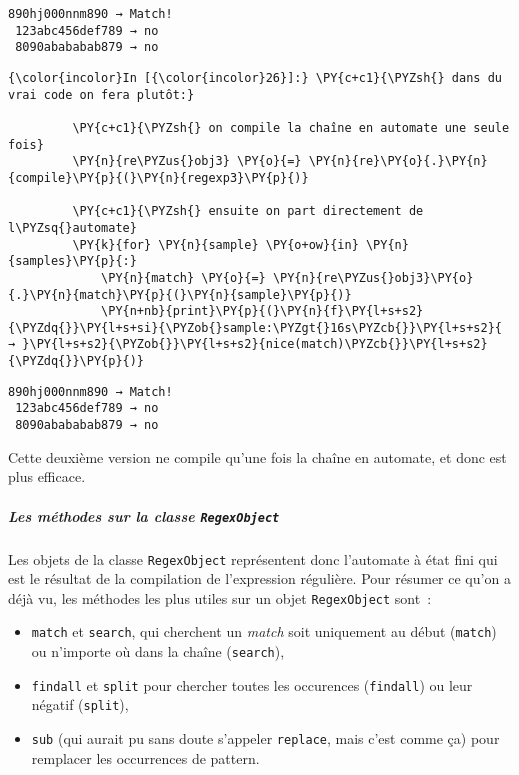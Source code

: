     \begin{Verbatim}[commandchars=\\\{\},frame=single,framerule=0.3mm,rulecolor=\color{cellframecolor}]
  890hj000nnm890 → Match!
 123abc456def789 → no
 8090abababab879 → no
\end{Verbatim}

    \begin{Verbatim}[commandchars=\\\{\},frame=single,framerule=0.3mm,rulecolor=\color{cellframecolor}]
{\color{incolor}In [{\color{incolor}26}]:} \PY{c+c1}{\PYZsh{} dans du vrai code on fera plutôt:}
         
         \PY{c+c1}{\PYZsh{} on compile la chaîne en automate une seule fois}
         \PY{n}{re\PYZus{}obj3} \PY{o}{=} \PY{n}{re}\PY{o}{.}\PY{n}{compile}\PY{p}{(}\PY{n}{regexp3}\PY{p}{)}
         
         \PY{c+c1}{\PYZsh{} ensuite on part directement de l\PYZsq{}automate}
         \PY{k}{for} \PY{n}{sample} \PY{o+ow}{in} \PY{n}{samples}\PY{p}{:}
             \PY{n}{match} \PY{o}{=} \PY{n}{re\PYZus{}obj3}\PY{o}{.}\PY{n}{match}\PY{p}{(}\PY{n}{sample}\PY{p}{)}
             \PY{n+nb}{print}\PY{p}{(}\PY{n}{f}\PY{l+s+s2}{\PYZdq{}}\PY{l+s+si}{\PYZob{}sample:\PYZgt{}16s\PYZcb{}}\PY{l+s+s2}{ → }\PY{l+s+s2}{\PYZob{}}\PY{l+s+s2}{nice(match)\PYZcb{}}\PY{l+s+s2}{\PYZdq{}}\PY{p}{)}
\end{Verbatim}


    \begin{Verbatim}[commandchars=\\\{\},frame=single,framerule=0.3mm,rulecolor=\color{cellframecolor}]
  890hj000nnm890 → Match!
 123abc456def789 → no
 8090abababab879 → no
\end{Verbatim}

    Cette deuxième version ne compile qu'une fois la chaîne en automate, et
donc est plus efficace.

    \hypertarget{les-muxe9thodes-sur-la-classe-regexobject}{%
\subparagraph{\texorpdfstring{Les méthodes sur la classe
\texttt{RegexObject}}{Les méthodes sur la classe RegexObject}}\label{les-muxe9thodes-sur-la-classe-regexobject}}

    Les objets de la classe \texttt{RegexObject} représentent donc
l'automate à état fini qui est le résultat de la compilation de
l'expression régulière. Pour résumer ce qu'on a déjà vu, les méthodes
les plus utiles sur un objet \texttt{RegexObject} sont~:

\begin{itemize}
\tightlist
\item
  \texttt{match} et \texttt{search}, qui cherchent un \emph{match} soit
  uniquement au début (\texttt{match}) ou n'importe où dans la chaîne
  (\texttt{search}),
\item
  \texttt{findall} et \texttt{split} pour chercher toutes les occurences
  (\texttt{findall}) ou leur négatif (\texttt{split}),
\item
  \texttt{sub} (qui aurait pu sans doute s'appeler \texttt{replace},
  mais c'est comme ça) pour remplacer les occurrences de pattern.
\end{itemize}


